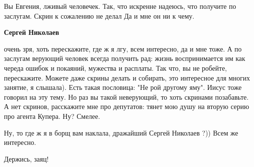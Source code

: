 \begin{itemize}

Вы Евгения, лживый человечек. Так, что искренне надеюсь, что получите по
заслугам. Скрин к сожалению не делал Да и мне он ни к чему.

\begin{itemize} %
\textbf{Сергей Николаев} 

очень зря, хоть перескажите, где ж я лгу, всем интересно, да и мне тоже. А по
заслугам верующий человек всегда получить рад: жизнь воспринимается им как
череда ошибок и покаяний, мужества и расплаты. Так что, вы не робейте,
перескажите. Можете даже скрины делать и собирать, это интересное для многих
занятие, я слышала). Есть такая пословица: "Не рой другому яму". Иисус тоже
говорил на эту тему. Но раз вы такой неверующий, то хоть скринами позабавьте. А
нет скринов, расскажите мне про депутатов: тянет мою душу на вторую серию про
агента Купера. Ну? Смелее.

\end{itemize} %

Ну, то где ж я в борщ вам наклала, дражайший Сергей Николаев ?)) Всем же интересно.


Держись, заяц!

\end{itemize} %
